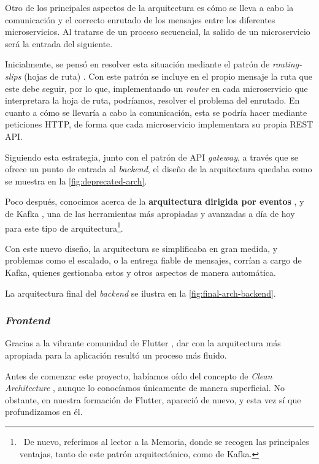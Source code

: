 Otro de los principales aspectos de la arquitectura es cómo se lleva a cabo la comunicación y el correcto enrutado de los mensajes entre los diferentes microservicios. Al tratarse de un proceso secuencial, la salido de un microservicio será la entrada del siguiente.

Inicialmente, se pensó en resolver esta situación mediante el patrón de \emph{routing-slips} (hojas de ruta) \cite{routing-slip}. Con este patrón se incluye en el propio mensaje la ruta que este debe seguir, por lo que, implementando un \emph{router} en cada microservicio que interpretara la hoja de ruta, podríamos, resolver el problema del enrutado. En cuanto a cómo se llevaría a cabo la comunicación, esta se podría hacer mediante peticiones HTTP, de forma que cada microservicio implementara su propia REST API.

Siguiendo esta estrategia, junto con el patrón de API \emph{gateway}, a través que se ofrece un punto de entrada al \emph{backend}, el diseño de la arquitectura quedaba como se muestra en la \autoref{fig:deprecated-arch}.

Poco después, conocimos acerca de la \textbf{arquitectura dirigida por eventos} \cite{event-driven}, y de Kafka \cite{apache-kafka}, una de las herramientas más apropiadas y avanzadas a día de hoy para este tipo de arquitectura\footnote{\, De nuevo, referimos al lector a la Memoria, donde se recogen las principales ventajas, tanto de este patrón arquitectónico, como de Kafka.}.

Con este nuevo diseño, la arquitectura se simplificaba en gran medida, y problemas como el escalado, o la entrega fiable de mensajes, corrían a cargo de Kafka, quienes gestionaba estos y otros aspectos de manera automática.

La arquitectura final del \emph{backend} se ilustra en la \autoref{fig:final-arch-backend}.


\subsubsection{\Large \emph{Frontend}}

Gracias a la vibrante comunidad de Flutter \cite{flutter-es}, dar con la arquitectura más apropiada para la aplicación resultó un proceso más fluido.

Antes de comenzar este proyecto, habíamos oído del concepto de \emph{Clean Architecture} \cite{martin15}, aunque lo conocíamos únicamente de manera superficial. No obstante, en nuestra formación de Flutter, apareció de nuevo, y esta vez sí que profundizamos en él.

